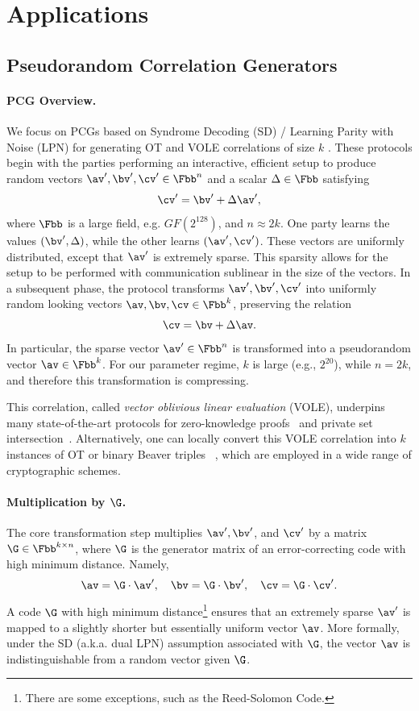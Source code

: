 
\section{Applications}\label{sec:application}


\subsection{Pseudorandom Correlation Generators }

\paragraph{PCG Overview.}
We focus on PCGs based on Syndrome Decoding (SD) / Learning Parity with Noise (LPN) for generating OT and VOLE correlations of size $k$ \cite{silentOTcrypto}. These protocols begin with the parties performing an interactive, efficient setup to produce random vectors $\av', \bv', \cv' \in \Fbb^n$ and a scalar $\Delta \in \Fbb$ satisfying
$$
  \cv' = \bv' + \Delta \av',
$$
where $\Fbb$ is a large field, e.g. $GF(2^{128})$, and $n\approx 2k$. One party learns the values $(\bv',\Delta)$, while the other learns $(\av',\cv')$. These vectors are uniformly distributed, except that $\av'$ is extremely sparse. This sparsity allows for the setup to be performed with communication sublinear in the size of the vectors. In a subsequent phase, the protocol transforms $\av',\bv',\cv'$ into 
uniformly random looking vectors $\av,\bv,\cv \in \Fbb^k$, preserving the relation
$$
  \cv = \bv + \Delta \av.
$$
In particular, the sparse vector $\av'\in \Fbb^n$ is transformed into a pseudorandom vector $\av\in \Fbb^k$. For our parameter regime, $k$ is large (e.g., $2^{20}$), while $n = 2k$, and therefore this transformation is compressing. 

This correlation, called \emph{vector oblivious linear evaluation} (VOLE), underpins many state-of-the-art protocols for zero-knowledge proofs~\cite{wolverine,ferret} and private set intersection~\cite{volePSI,blazingPSI}. Alternatively, one can locally convert this VOLE correlation into $k$ instances of OT or binary Beaver triples~\cite{silentOTCCS} \cite{silentOTcrypto}, which are employed in a wide range of cryptographic schemes.

\paragraph{Multiplication by $\G$.}
The core transformation step multiplies $\av',\bv'$, and
$\cv'$ by a matrix $\G\in \Fbb^{k\times n}$, where $\G$ is the generator matrix of an error-correcting code with high minimum distance. Namely,
$$
  \av =\G \cdot \av', 
  \quad
  \bv = \G \cdot \bv', 
  \quad
  \cv = \G \cdot \cv'.
$$
A code $\G$ with high minimum distance\footnote{There are some exceptions, such as the Reed-Solomon Code.} ensures that an extremely sparse $\av'$ is mapped to a slightly shorter but essentially uniform vector $\av$. More formally, under the SD (a.k.a. dual LPN) assumption associated with $\G$, the vector $\av$ is indistinguishable from a random vector given $\G$.

